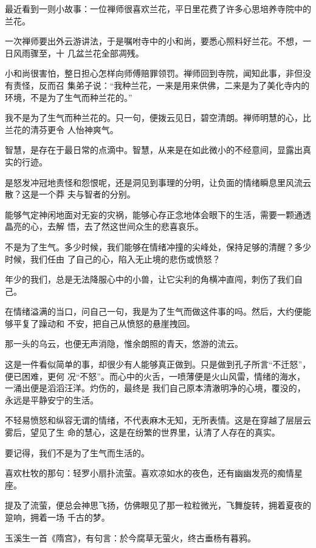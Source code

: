 \documentclass[12pt,a4paper]{article}
\begin{document}
		最近看到一则小故事：一位禅师很喜欢兰花，平日里花费了许多心思培养寺院中的兰花。

		一次禅师要出外云游讲法，于是嘱咐寺中的小和尚，要悉心照料好兰花。不想，一日风雨骤至，十
	几盆兰花全部凋残。

		小和尚很害怕，整日担心怎样向师傅赔罪领罚。禅师回到寺院，闻知此事，非但没有责怪，反而召
	集弟子说：“我种兰花，一来是用来供佛，二来是为了美化寺内的环境，不是为了生气而种兰花的。”

		我不是为了生气而种兰花的。只一句，便拨云见日，碧空清朗。禅师明慧的心，比兰花的清芬更令
	人怡神爽气。

		智慧，是存在于最日常的点滴中。智慧，从来是在如此微小的不经意间，显露出真实的行迹。

		是怒发冲冠地责怪和怨恨呢，还是洞见到事理的分明，让负面的情绪瞬息里风流云散？这是一个莽
	夫与智者的分别。

		能够气定神闲地面对无妄的灾祸，能够心存正念地体会眼下的生活，需要一颗通透晶亮的心，去解
	悟，去了然这世间众生的悲喜哀乐。

		不是为了生气。多少时候，我们能够在情绪冲撞的尖峰处，保持足够的清醒？多少时候，我们任由
	了自己的心，陷入无止境的悲伤或愤怒？

		年少的我们，总是无法降服心中的小兽，让它尖利的角横冲直闯，刺伤了我们自己。

		在情绪溢满的当口，问自己一句，我是为了生气而做这件事的吗。然后，大约便能够平复了躁动和
	不安，把自己从愤怒的悬崖拽回。

		那一头的乌云，也便无声消隐，惟余朗照的青天，悠游的流云。

		这是一件看似简单的事，却很少有人能够真正做到。只是做到孔子所言“不迁怒”，便已困难，更何
	况“不怒”。而心中的火舌，一喷薄便是火山风雷，情绪的海水，一涌出便是滔滔汪洋。灼伤的，最终是
	我们自己原本清澈明净的心境，覆没的，永远是平静安宁的生活。

		不轻易愤怒和纵容无谓的情绪，不代表麻木无知，无所表情。这是在穿越了层层云雾后，望见了生
	命的慧心，这是在纷繁的世界里，认清了人存在的真实。

		要记得，我们不是为了生气而生活的。

	\endwriting



		喜欢杜牧的那句：轻罗小扇扑流萤。喜欢凉如水的夜色，还有幽幽发亮的痴情星座。

		提及了流萤，便总会神思飞扬，仿佛眼见了那一粒粒微光，飞舞旋转，拥着夏夜的跫响，拥着一场
	千古的梦。

		玉溪生一首《隋宫》，有句言：於今腐草无萤火，终古垂杨有暮鸦。
\end{document}
